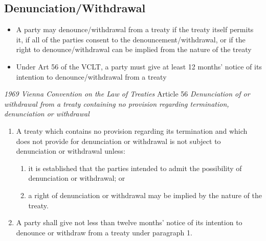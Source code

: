 \subsection{Denunciation/Withdrawal}
\begin{itemize}
    \item A party may denounce/withdrawal from a treaty if the treaty itself permits it, if all of the parties consent to the denouncement/withdrawal, or if the right to denounce/withdrawal can be implied from the nature of the treaty
    \item Under Art 56 of the VCLT, a party must give at least 12 months' notice of its intention to denounce/withdrawal from a treaty
\end{itemize}
\begin{conventiondetails}{\textit{1969 Vienna Convention on the Law of Treaties} Article 56}\label{VCLT Art 56}
    \flushleft
    \textit{Denunciation of or withdrawal from a treaty containing no provision regarding termination, denunciation or withdrawal}

    \begin{enumerate}
        \item A treaty which contains no provision regarding its termination and which does not provide for denunciation or withdrawal is not subject to denunciation or withdrawal unless:
        \begin{enumerate}[label=(\alph*)]
            \item it is established that the parties intended to admit the possibility of denunciation or withdrawal; or 
            \item a right of denunciation or withdrawal may be implied by the nature of the treaty.
        \end{enumerate}
        \item A party shall give not less than twelve months' notice of its intention to denounce or withdraw from a treaty under paragraph 1.
    \end{enumerate}
\end{conventiondetails}

